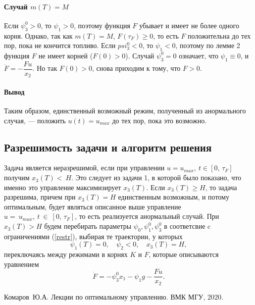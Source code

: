 \documentclass[16pt]{article}
\begin{document}
\paragraph{Случай $m(T) = M$}
Если $\psi_3^0 > 0$, то $\psi_1 > 0$, поэтому функция $F$ убывает и имеет не более одного корня. Однако, так как 
$m(T) = M$, $F(\tau_F) \geqslant 0$, то есть $F$ положительна до тех пор, пока не кончится топливо. Если 
$psi_3^0 < 0$, то $\psi_1 < 0$, поэтому по лемме 2 функция $F$ не имеет корней ($F(0) > 0$). Случай $\psi_3^0 = 0$
означает, что $\psi_1 \equiv 0$, и $\dot{F} = -\dfrac{Fu}{x_2}$. Но так $F(0) > 0$, снова приходим к тому, 
что $F > 0$.

\paragraph{Вывод} Таким образом, единственный возможный режим, полученный из анормального случая, --- положить
$u(t) = u_{max}$ до тех пор, пока это возможно.

\subsection{Разрешимость задачи и алгоритм решения}
Задача является неразрешимой, если при управлении $u = u_{max}, \ t \in [0,\,\tau_F]$ получим $x_3(T) <~H$.
Это следует из задачи 1, в которой было показано, что именно это управление максимизирует $x_3(T)$. Если 
$x_3(T) \geqslant H$, то задача разрешима, причем при $x_3(T) = H$ единственным возможным, и потому оптимальным, будет
являться описанное выше управление $u =~u_{max}, \ t~\in~[0,\,\tau_F]$, то есть реализуется анормальный случай.
При $x_3(T) > H$ будем перебирать параметры $\psi_0, \psi_1^0, \psi_3^0$ в соответсвие c ограничениями (\ref{restr}),
выбирая те траектории, у которых $$\psi_1(T) = 0,\quad \psi_2 < 0,\quad x_3(T) = H,$$
переключаясь между режимами в корнях $K$ и $F$, которые описываются уравнением
$$\dot{F} = -\psi_3^0x_1 - \psi_1g - \dfrac{Fu}{x_2}.$$
\newpage
\begin{thebibliography}{0}
	Комаров~Ю.А. Лекции по оптимальному управлению. ВМК МГУ, 2020. 
\end{thebibliography}
\end{document}
